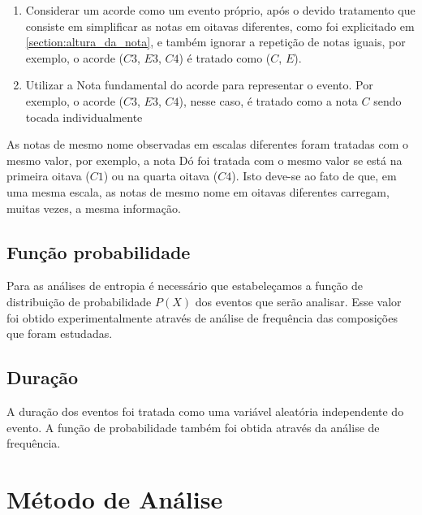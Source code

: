 \begin{enumerate}
    \item Considerar um acorde como um evento próprio, após o devido tratamento que consiste em simplificar as notas em oitavas diferentes, como foi explicitado em \ref{section:altura_da_nota}, e também ignorar a repetição de notas iguais, por exemplo, o acorde ($C3$, $E3$, $C4$) é tratado como ($C$, $E$).

    \item Utilizar a Nota fundamental do acorde para representar o evento. Por exemplo, o acorde ($C3$, $E3$, $C4$), nesse caso, é tratado como a nota $C$ sendo tocada individualmente
\end{enumerate}

As notas de mesmo nome observadas em escalas diferentes foram tratadas com o mesmo valor, por exemplo, a nota Dó foi tratada com o mesmo valor se está na primeira oitava ($C1$) ou na quarta oitava ($C4$). Isto deve-se ao fato de que, em uma mesma escala, as notas de mesmo nome em oitavas diferentes carregam, muitas vezes, a mesma informação.

\subsection{Função probabilidade}

Para as análises de entropia é necessário que estabeleçamos a função de distribuição de probabilidade $P(X)$ dos eventos que serão analisar. Esse valor foi obtido experimentalmente através de análise de frequência das composições que foram estudadas.
\subsection{Duração}

A duração dos eventos foi tratada como uma variável aleatória independente do evento. A função de probabilidade também foi obtida através da análise de frequência.

\section{Método de Análise}
